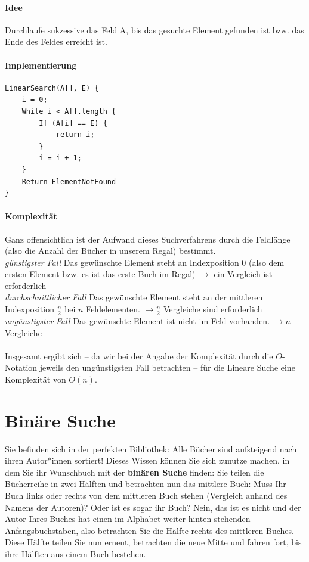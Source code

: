 \documentclass[11pt,a4paper]{scrartcl}
\begin{document}
\paragraph{Idee}
Durchlaufe sukzessive das Feld A, bis das gesuchte Element gefunden ist bzw. das Ende des Feldes erreicht ist.
\paragraph{Implementierung}
\begin{lstlisting}
LinearSearch(A[], E) {
	i = 0;
	While i < A[].length {
		If (A[i] == E) {
			return i;			
		}
		i = i + 1;	
	}
	Return ElementNotFound
}
\end{lstlisting}
\paragraph{Komplexität}
Ganz offensichtlich ist der Aufwand dieses Suchverfahrens durch die Feldlänge (also die Anzahl der Bücher in unserem Regal) bestimmt. \\
\textit{günstigster Fall} \quad Das gewünschte Element steht an Indexposition 0 (also dem ersten Element bzw. es ist das erste Buch im Regal) $\to$ ein Vergleich ist erforderlich
\\
\textit{durchschnittlicher Fall} \quad Das gewünschte Element steht an der mittleren Indexposition $\frac{n}{2}$ bei $n$ Feldelementen. $\to \frac{n}{2}$ Vergleiche sind erforderlich
\\
\textit{ungünstigster Fall} \quad Das gewünschte Element ist nicht im Feld vorhanden. $\to n$ Vergleiche
\\\\
Insgesamt ergibt sich -- da wir bei der Angabe der Komplexität durch die $O$-Notation jeweils den ungünstigsten Fall betrachten -- für die Lineare Suche eine Komplexität von $O(n)$. 
\section{Binäre Suche}
Sie befinden sich in der perfekten Bibliothek: Alle Bücher sind aufsteigend nach ihren Autor*innen sortiert! Dieses Wissen können Sie sich zunutze machen, in dem Sie ihr Wunschbuch mit der \textbf{binären Suche} finden: Sie teilen die Bücherreihe in zwei Hälften und betrachten nun das mittlere Buch: Muss Ihr Buch links oder rechts von dem mittleren Buch stehen (Vergleich anhand des Namens der Autoren)? Oder ist es sogar ihr Buch? Nein, das ist es nicht und der Autor Ihres Buches hat einen im Alphabet weiter hinten stehenden Anfangsbuchstaben, also betrachten Sie die Hälfte rechts des mittleren Buches. Diese Hälfte teilen Sie nun erneut, betrachten die neue Mitte und fahren fort, bis ihre Hälften aus einem Buch bestehen.
\end{document}
